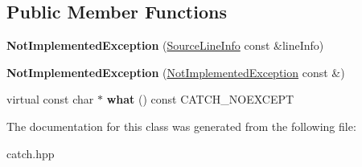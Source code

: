 \subsection*{Public Member Functions}
\begin{DoxyCompactItemize}
\item 
\mbox{\label{classCatch_1_1NotImplementedException_ab4f0a5c39d8ffb72c664e2c07e180634}} 
{\bfseries Not\+Implemented\+Exception} (\hyperlink{structCatch_1_1SourceLineInfo}{Source\+Line\+Info} const \&line\+Info)
\item 
\mbox{\label{classCatch_1_1NotImplementedException_a508a7a833455da2d3c10ea1a9d45e982}} 
{\bfseries Not\+Implemented\+Exception} (\hyperlink{classCatch_1_1NotImplementedException}{Not\+Implemented\+Exception} const \&)
\item 
\mbox{\label{classCatch_1_1NotImplementedException_ad4c13963f1a8feacda0cd331adda89e3}} 
virtual const char $\ast$ {\bfseries what} () const C\+A\+T\+C\+H\+\_\+\+N\+O\+E\+X\+C\+E\+PT
\end{DoxyCompactItemize}


The documentation for this class was generated from the following file\+:\begin{DoxyCompactItemize}
\item 
catch.\+hpp\end{DoxyCompactItemize}
